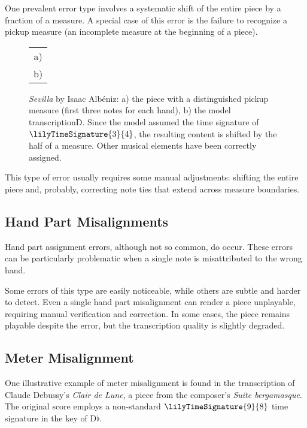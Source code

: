 One prevalent error type involves a systematic shift of the entire piece by a fraction of a measure. A special case of this error is the failure to recognize a pickup measure (an incomplete measure at the beginning of a piece).

\begin{figure}[ht!]
\centering
\begin{tabular}{c}a)
 \\ b)

\end{tabular}
\caption[\emph{Sevilla} by Isaac Albéniz.]{\emph{Sevilla} by Isaac Albéniz: a) the piece with a distinguished pickup measure (first three notes for each hand), b) the model transcriptionD. Since the model assumed the time signature of $\lilyTimeSignature{3}{4}$, the resulting content is shifted by the half of a measure. Other musical elements have been correctly assigned.}
\label{albeniz}
\end{figure}

This type of error usually requires some manual adjustments: shifting the entire piece and, probably, correcting note ties that extend across measure boundaries.

\subsection{Hand Part Misalignments}

Hand part assignment errors, although not so common, do occur. These errors can be particularly problematic when a single note is misattributed to the wrong hand.

Some errors of this type are easily noticeable, while others are subtle and harder to detect. Even a single hand part misalignment can render a piece unplayable, requiring manual verification and correction. In some cases, the piece remains playable despite the error, but the transcription quality is slightly degraded.

\subsection{Meter Misalignment}\label{meter_misalignment}

One illustrative example of meter misalignment is found in the transcription of Claude Debussy’s \emph{Clair de Lune}, a piece from the composer’s \emph{Suite bergamasque}. The original score employs a non-standard $\lilyTimeSignature{9}{8}$ time signature in the key of D$\flat$.

